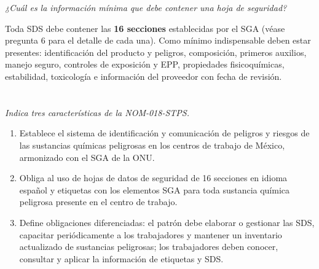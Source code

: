 \textit{¿Cuál es la información mínima que debe contener una hoja de seguridad?}

\vspace{0.3cm}
Toda SDS debe contener las \textbf{16 secciones} establecidas por el SGA (véase pregunta 6 para el detalle de cada una). Como mínimo indispensable deben estar presentes: identificación del producto y peligros, composición, primeros auxilios, manejo seguro, controles de exposición y EPP, propiedades fisicoquímicas, estabilidad, toxicología e información del proveedor con fecha de revisión.


{}
\section*{\centering\fontsize{12}{18}}

\textit{Indica tres características de la NOM-018-STPS.}

\vspace{0.3cm}
\begin{enumerate}
    \item Establece el sistema de identificación y comunicación de peligros y riesgos de las sustancias químicas peligrosas en los centros de trabajo de México, armonizado con el SGA de la ONU.
    \item Obliga al uso de hojas de datos de seguridad de 16 secciones en idioma español y etiquetas con los elementos SGA para toda sustancia química peligrosa presente en el centro de trabajo.
    \item Define obligaciones diferenciadas: el patrón debe elaborar o gestionar las SDS, capacitar periódicamente a los trabajadores y mantener un inventario actualizado de sustancias peligrosas; los trabajadores deben conocer, consultar y aplicar la información de etiquetas y SDS.
\end{enumerate}